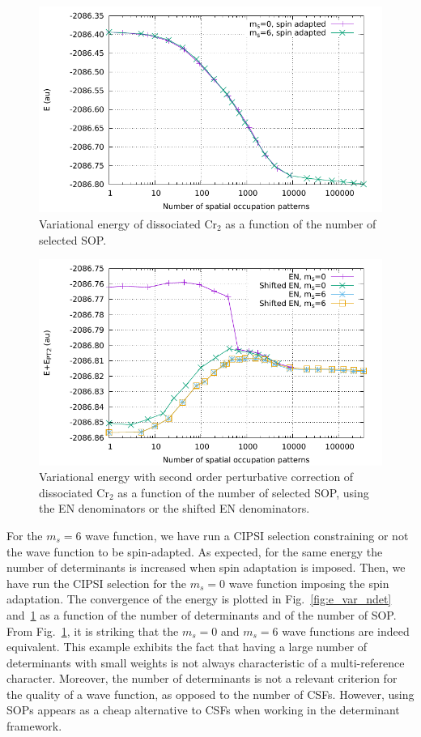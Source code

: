 \documentclass[aip,jcp,reprint,showkeys]{revtex4-1}
\newcommand{\sop}{SOP}
\newcommand{\cipsi}{CIPSI}
\newcommand{\csf}{CSF}
\begin{document}
\begin{figure}
\includegraphics[width=0.9\columnwidth]{e_var_nsop}
\caption{Variational energy of dissociated Cr$_2$ as a function of the number of
selected {\sop}.}
\label{fig:e_var_nsop}
\end{figure}

\begin{figure}
\includegraphics[width=0.9\columnwidth]{e_pt2_nsop}
\caption{Variational energy with second order perturbative correction of
dissociated Cr$_2$ as a function of the number of selected {\sop}, using
the EN denominators or the shifted EN denominators.}
\label{fig:e_pt2_nsop}
\end{figure}

For the $m_s=6$ wave function, we have run a \cipsi{} selection constraining or not the
wave function to be spin-adapted. As expected, for the same energy the number of
determinants is increased when spin adaptation is imposed. Then, we have run the
{\cipsi} selection for the $m_s=0$ wave function imposing the spin adaptation.
The convergence of the energy is plotted in Fig.~\ref{fig:e_var_ndet}
and~\ref{fig:e_var_nsop} as a function of the number of determinants and of the
number of {\sop}.
From Fig.~\ref{fig:e_var_nsop}, it is striking that the $m_s=0$ and $m_s=6$
wave functions are indeed equivalent.
This example exhibits the fact that having a large number of determinants with
small weights is not always characteristic of a multi-reference character.
Moreover, the number of determinants is not a relevant criterion for the
quality of a wave function, as opposed to the number of {\csf s}. However, using {\sop s}
appears as a cheap alternative to {\csf s} when working in the determinant
framework.
\end{document}
